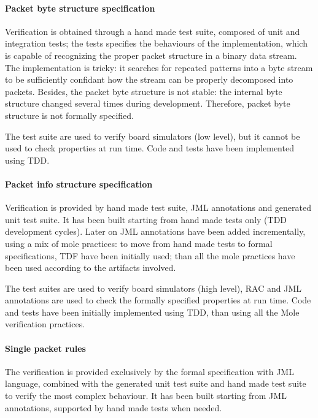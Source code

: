 \documentclass[english]{lni}
\begin{document}
\paragraph*{Packet byte structure specification}

Verification is obtained through a hand made test suite, composed of unit and integration tests; the tests specifies the behaviours of the implementation, which is capable of recognizing the proper packet structure in a binary data stream. 
The implementation is tricky: it searches for repeated patterns into a byte stream to be sufficiently confidant how the stream can be properly decomposed into packets.
Besides, the packet byte structure is not stable: the internal byte structure changed several times during development.
Therefore, packet byte structure is not formally specified.

The test suite are used to verify board simulators (low level), but it cannot be used to check properties at run time.
Code and tests have been implemented using TDD.

\paragraph*{Packet info structure specification}

Verification is provided by hand made test suite, JML annotations and generated unit test suite. 
It has been built starting from hand made tests only (TDD development cycles).
Later on JML annotations have been added incrementally, using a mix of mole practices: to move from hand made tests to formal specifications, TDF have been initially used; than all the mole practices have been used according to the artifacts involved.

The test suites are used to verify board simulators (high level), RAC and JML annotations are used to check the formally specified properties at run time.
Code and tests have been initially implemented using TDD, than using all the Mole verification practices.

\paragraph*{Single packet rules}

The verification is provided exclusively by the formal specification with JML language, combined with the generated unit test suite and hand made test suite to verify the most complex behaviour.
It has been built starting from JML annotations, supported by hand made tests when needed.
\end{document}
